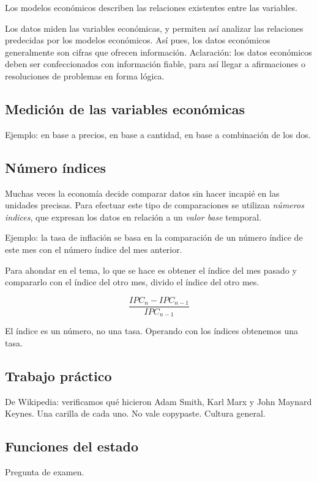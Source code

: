Los modelos económicos describen las relaciones existentes entre las variables.

Los datos miden las variables económicas,
y permiten así analizar las relaciones predecidas por los modelos económicos.
Así pues,
los datos económicos generalmente son cifras que ofrecen información.
Aclaración: los datos económicos deben ser confeccionados con información fiable,
para así llegar a afirmaciones o resoluciones de problemas en forma lógica.

\subsection{Medición de las variables económicas}

Ejemplo: en base a precios,
en base a cantidad,
en base a combinación de los dos.

\subsection{Número índices}

Muchas veces la economía decide comparar datos sin hacer incapié en las unidades precisas.
Para efectuar este tipo de comparaciones se utilizan \textit{números indices},
que expresan los datos en relación a un \textit{valor base} temporal.

Ejemplo: la tasa de inflación se basa en la comparación de un número índice de este mes con 
el número índice del mes anterior.

Para ahondar en el tema, lo que se hace es 
obtener el índice del mes pasado y compararlo con el índice del otro mes,
divido el índice del otro mes.

\begin{equation*}
    \frac{IPC_{n} - IPC_{n-1}}{IPC_{n-1}}
\end{equation*}

El índice es un número, no una tasa.
Operando con los índices obtenemos una tasa.

\subsection{Trabajo práctico}

De Wikipedia: verificamos qué hicieron Adam Smith, Karl Marx y John Maynard Keynes.
Una carilla de cada uno. No vale copypaste. Cultura general.

\subsection{Funciones del estado}

Pregunta de examen.